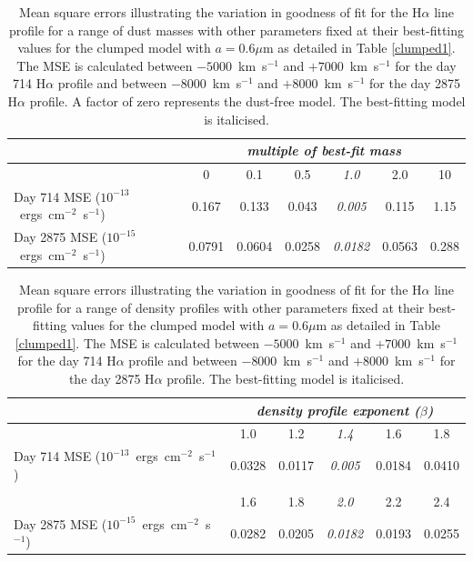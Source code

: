 \begin{landscape}
\setlength{\tabcolsep}{16pt}
\begin{table}
\centering
\caption{Mean square errors illustrating the variation in goodness of fit for the H$\alpha$ line profile for a range of dust masses with other parameters fixed at their best-fitting values for the clumped model with $a=0.6\mu$m as detailed in Table \ref{clumped1}.  The MSE is calculated between $-5000$~km~s$^{-1}$ and $+7000$~km~s$^{-1}$ for the day 714 H$\alpha$ profile and between $-8000$~km~s$^{-1}$ and $+8000$~km~s$^{-1}$ for the day 2875 H$\alpha$ profile.  A factor of zero represents the dust-free model.  The best-fitting model is italicised.}
\begin{tabular}{l c c c c c c}
\hline
& \multicolumn{6}{c}{\textit{multiple of best-fit mass}}\\
\hline
& 0 & 0.1 & 0.5 & \textit{1.0} & 2.0 & 10 \\
\hline
Day 714 MSE ($10^{-13}$~ergs~cm$^{-2}$~s$^{-1}$)  &0.167 & 0.133 &0.043 & \textit{0.005} &0.115&1.15\\
Day 2875 MSE ($10^{-15}$~ergs~cm$^{-2}$~s$^{-1}$) &0.0791 & 0.0604 & 0.0258 &\textit{0.0182}&0.0563&0.288 \\
\hline
\end{tabular}
\label{MSE_mass}
\end{table}%

\setlength{\tabcolsep}{20pt}
\begin{table}
\centering
\caption{Mean square errors illustrating the variation in goodness of fit for the H$\alpha$ line profile for a range of density profiles with other parameters fixed at their best-fitting values for the clumped model with $a=0.6\mu$m as detailed in Table \ref{clumped1}. The MSE is calculated between $-5000$~km~s$^{-1}$ and $+7000$~km~s$^{-1}$ for the day 714 H$\alpha$ profile and between $-8000$~km~s$^{-1}$ and $+8000$~km~s$^{-1}$ for the day 2875 H$\alpha$ profile. The best-fitting model is italicised.}
\begin{tabular}{l c c c c c}
\hline
& \multicolumn{5}{c}{\textit{density profile exponent ($\beta$)}}\\
\hline
& 1.0 & 1.2 & \textit{1.4} & 1.6 & 1.8 \\
\hline
Day 714 MSE ($10^{-13}$~ergs~cm$^{-2}$~s$^{-1}$)  & 0.0328 & 0.0117 & \textit{0.005} & 0.0184 & 0.0410\\
\hline
\\
\hline
& 1.6 & 1.8 & \textit{2.0} & 2.2 & 2.4 \\
\hline
Day 2875 MSE ($10^{-15}$~ergs~cm$^{-2}$~s$^{-1}$) & 0.0282 & 0.0205 & \textit{0.0182} & 0.0193 & 0.0255 \\
\hline
\end{tabular}

\label{MSE_beta}
\end{table}%
\end{landscape}

